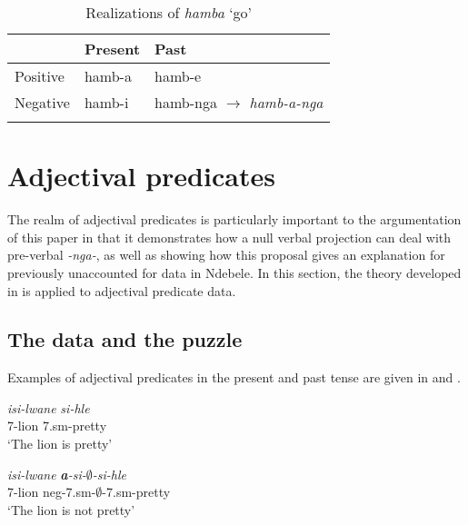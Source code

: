 \documentclass[output=paper]{langsci/langscibook}
\begin{document}
\begin{table}
\caption{Realizations of \textit{hamba} `go'} %
\centering %
\begin{tabular}{lll}
\lsptoprule
 & Present & Past\\
\midrule%
Positive & hamb-a  & hamb-e  \\ %
Negative & hamb-i & hamb-nga $\longrightarrow$ \textit{hamb-a-nga}\\[1ex] %
\lspbottomrule
\end{tabular} 
\label{tab:burkholder:5} 
\end{table} 





\section{Adjectival predicates}\label{sec:burkholder:3}

The realm of adjectival predicates is particularly important to the argumentation of this paper in that it demonstrates how a null verbal projection can deal with pre-verbal \textit{-nga-}, as well as showing how this proposal gives an explanation for previously unaccounted for data in Ndebele. In this section, the theory developed in  is applied to adjectival predicate data.

\subsection{The data and the puzzle}

Examples of adjectival predicates in the present and past tense are given in  and .

\begin{exe}
\ex\label{ex:burkholder:12} \begin{xlist}
\ex\label{ex:burkholder:12a} \gll \textit{isi-lwane} \textit{si-hle}\\
       7-lion 7.{\sc sm}-pretty\\
    \glt `The lion is pretty' 

\ex\label{ex:burkholder:12b} \gll \textit{isi-lwane} \textit{\textbf{a}-si-$\emptyset$-si-hle}\\
       7-lion {\sc neg}-7.{\sc sm}-$\emptyset$-7.{\sc sm}-pretty\\
    \glt `The lion is not pretty' 
\end{xlist}
\end{exe}
\end{document}
